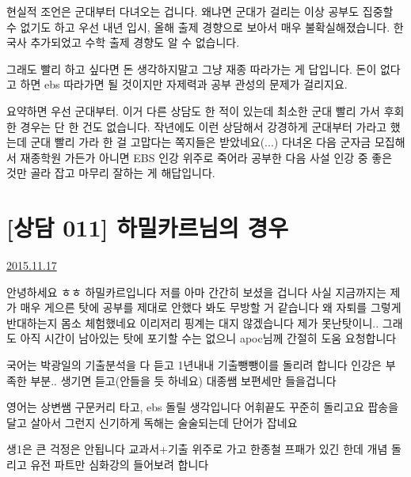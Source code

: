 현실적 조언은 군대부터 다녀오는 겁니다. 왜냐면 군대가 걸리는 이상 공부도 집중할 수 없기도 하고
우선 내년 입시, 올해 출제 경향으로 보아서 매우 불확실해졌습니다.
한국사 추가되었고 수학 출제 경향도 알 수 없습니다.
\vspace{5mm}

그래도 빨리 하고 싶다면 돈 생각하지말고 그냥 재종 따라가는 게 답입니다.
돈이 없다고 하면 ebs 따라가면 될 것이지만 자제력과 공부 관성의 문제가 걸리지요.
\vspace{5mm}

요약하면
우선 군대부터. 이거 다른 상담도 한 적이 있는데 최소한 군대 빨리 가서 후회한 경우는 단 한 건도 없습니다.
작년에도 이런 상담해서 강경하게 군대부터 가라고 했는데 군대 빨리 가라 한 걸 고맙다는 쪽지들은 받았네요(...)
다녀온 다음 군자금 모집해서 재종학원 가든가
아니면 EBS 인강 위주로 죽어라 공부한 다음 사설 인강 중 좋은 것만 골라 잡고 마무리 잘하는 게 해답입니다.
\vspace{5mm}






\section{[상담 011] 하밀카르님의 경우}
\href{https://www.kockoc.com/Apoc/496696}{2015.11.17}


        
    \vspace{5mm}

    안녕하세요 ㅎㅎ 하밀카르입니다
    저를 아마 간간히 보셨을 겁니다
    사실 지금까지는 제가 매우 게으른 탓에 공부를 제대로 안했다 봐도 무방할 거 같습니다
    왜 자퇴를 그렇게 반대하는지 몸소 체험했네요
    이리저리 핑계는 대지 않겠습니다 제가 못난탓이니..
    그래도 아직 시간이 남아있는 탓에 포기할 수는 없으니 apoc님께 간절히 도움 요청합니다
    \vspace{5mm}

    국어는 박광일의 기출분석을 다 듣고 1년내내 기출뺑뺑이를 돌리려 합니다
    인강은 부족한 부분..  생기면 듣고(안들을 듯 하네요) 대종쌤 보편세만 들을겁니다
    \vspace{5mm}

    영어는 상변쌤 구문커리 타고, ebs 돌릴 생각입니다 어휘끝도 꾸준히 돌리고요
    팝송을 달고 살아서 그런지 신기하게 독해는 술술되는데 단어가 잡네요
    \vspace{5mm}

    생1은 큰 걱정은 안됩니다 교과서+기출 위주로 가고
    한종철 프패가 있긴 한데 개념 돌리고 유전 파트만 심화강의 들어보려 합니다
    \vspace{5mm}


